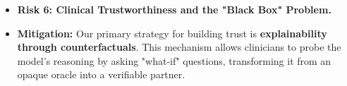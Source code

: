 \documentclass[11pt, a4paper]{article}
\begin{document}
\begin{itemize}
    \item \textbf{Risk 6: Clinical Trustworthiness and the "Black Box" Problem.}
    \item \textbf{Mitigation:} Our primary strategy for building trust is \textbf{explainability through counterfactuals}. This mechanism allows clinicians to probe the model's reasoning by asking "what-if" questions, transforming it from an opaque oracle into a verifiable partner.
\end{itemize}



\end{document}
